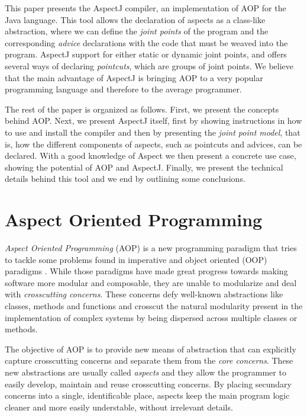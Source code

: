 \documentclass{template}
\begin{document}
This paper presents the AspectJ compiler, an implementation of AOP for the Java language. This tool allows the declaration
of aspects as a class-like abstraction, where we can define the \emph{joint points} of the program and the corresponding
\emph{advice} declarations with the code that must be weaved into the program. AspectJ support for either static or dynamic joint points,
and offers several ways of declaring \emph{pointcuts}, which are groups of joint points.
We believe that the main advantage of AspectJ is bringing AOP to a very popular programming language and therefore to the average programmer.

The rest of the paper is organized as follows. First, we present the concepts behind AOP. Next, we present
AspectJ itself, first by showing instructions in how to use and install the compiler and then by presenting the \emph{joint point model},
that is, how the different components of aspects, such as pointcuts and advices, can be declared. With a good knowledge
of Aspect we then present a concrete use case, showing the potential of AOP and AspectJ. Finally, we present the technical details
behind this tool and we end by outlining some conclusions.

\section{Aspect Oriented Programming}

\emph{Aspect Oriented Programming} (AOP) is a new programming paradigm that tries to tackle some problems
found in imperative and object oriented (OOP) paradigms \cite{Kiczales97aspect-orientedprogramming}. While those paradigms have made great progress towards
making software more modular and composable, they are unable to modularize and deal with \emph{crosscutting concerns}.
These concerns defy well-known abstractions like classes, methods and functions and crosscut the
natural modularity present in the implementation of complex systems by being dispersed
across multiple classes or methods. \cite{Kiczales01anoverview}

The objective of AOP is to provide new means of abstraction that can explicitly capture crosscutting concerns
and separate them from the \emph{core concerns}. These new abstractions are usually called \emph{aspects}
and they allow the programmer to easily develop, maintain and reuse crosscutting concerns. By placing
secundary concerns into a single, identificable place, aspects keep the main program logic cleaner and more easily
understable, without irrelevant details.
\end{document}
